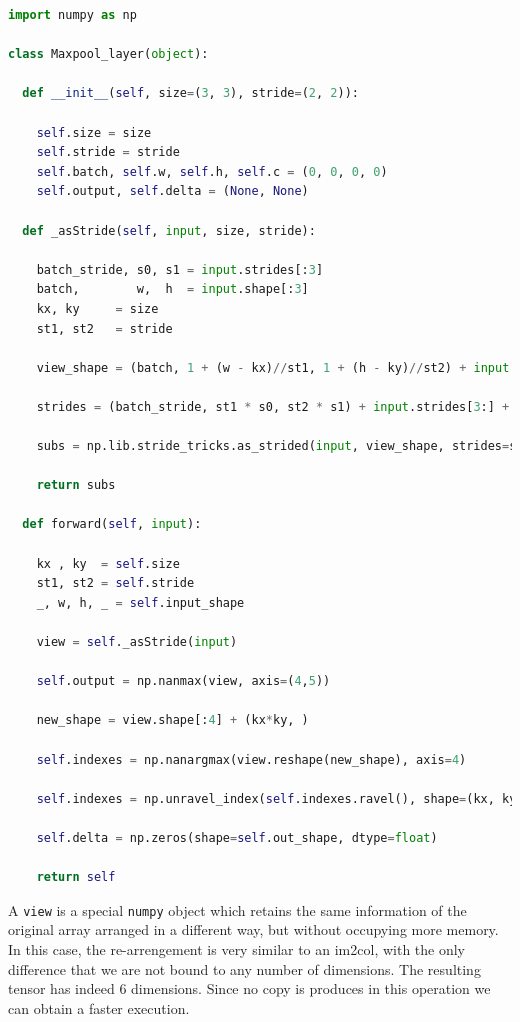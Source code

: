 \documentclass[12pt,a4paper]{report}
\begin{document}
\lstset{style=snippet}
\begin{lstlisting}[language=Python, caption=NumPyNet version of Maxpool function, label=code:py_avgpool]
import numpy as np

class Maxpool_layer(object):

  def __init__(self, size=(3, 3), stride=(2, 2)):

    self.size = size
    self.stride = stride
    self.batch, self.w, self.h, self.c = (0, 0, 0, 0)
    self.output, self.delta = (None, None)

  def _asStride(self, input, size, stride):

    batch_stride, s0, s1 = input.strides[:3]
    batch,        w,  h  = input.shape[:3]
    kx, ky     = size
    st1, st2   = stride

    view_shape = (batch, 1 + (w - kx)//st1, 1 + (h - ky)//st2) + input.shape[3:] + (kx, ky)

    strides = (batch_stride, st1 * s0, st2 * s1) + input.strides[3:] + (s0, s1)

    subs = np.lib.stride_tricks.as_strided(input, view_shape, strides=strides)
    
    return subs

  def forward(self, input):

    kx , ky  = self.size
    st1, st2 = self.stride
    _, w, h, _ = self.input_shape

    view = self._asStride(input)

    self.output = np.nanmax(view, axis=(4,5))

    new_shape = view.shape[:4] + (kx*ky, )

    self.indexes = np.nanargmax(view.reshape(new_shape), axis=4)

    self.indexes = np.unravel_index(self.indexes.ravel(), shape=(kx, ky))

    self.delta = np.zeros(shape=self.out_shape, dtype=float)

    return self

\end{lstlisting}

A \texttt{view} is a special \texttt{numpy} object which retains the same information of the original array arranged in a different way, but without occupying more memory. In this case, the re-arrengement is very similar to an im2col, with the only difference that we are not bound to any number of dimensions. The resulting tensor has indeed 6 dimensions.
Since no copy is produces in this operation we can obtain a faster execution.
\end{document}
